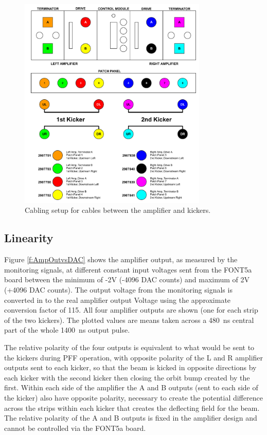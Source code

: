\begin{figure}
  \centering
  \includegraphics[width=0.8\textwidth]{Figures/commissioning/kickerCables}
  \caption{Cabling setup for cables between the amplifier and kickers.}
  \label{f:kickerCables}
\end{figure}


\subsection{Linearity}
\label{ss:ampLin}

Figure \ref{f:AmpOutvsDAC} shows the amplifier output, as measured by the monitoring signals, at different constant input voltages sent from the FONT5a board between the minimum of -2V (-4096 DAC counts) and maximum of 2V (+4096 DAC counts). The output voltage from the monitoring signals is converted in to the real amplifier output Voltage using the approximate conversion factor of 115. All four amplifier outputs are shown (one for each strip of the two kickers). The plotted values are means taken across a 480~ns central part of the whole 1400~ns output pulse.

The relative polarity of the four outputs is equivalent to what would be sent to the kickers during PFF operation, with opposite polarity of the L and R amplifier outputs sent to each kicker, so that the beam is kicked in opposite directions by each kicker with the second kicker then closing the orbit bump created by the first. Within each side of the amplifier the A and B outputs (sent to each side of the kicker) also have opposite polarity, necessary to create the potential difference across the strips within each kicker that creates the deflecting field for the beam. The relative polarity of the A and B outputs is fixed in the amplifier design and cannot be controlled via the FONT5a board.


